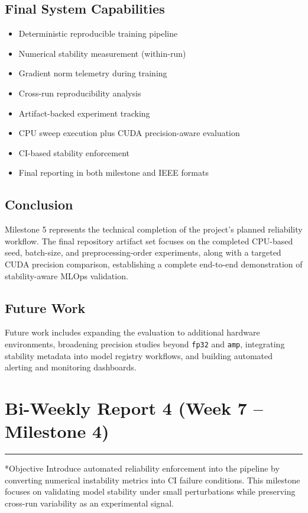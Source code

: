 \documentclass[11pt]{article}
\newcommand{\reportblock}[2]{%
  \section*{#1}%
  \vspace{2pt}\hrule\vspace{6pt}
}
\begin{document}
\subsection*{Final System Capabilities}
\begin{itemize}
  \item Deterministic reproducible training pipeline
  \item Numerical stability measurement (within-run)
  \item Gradient norm telemetry during training
  \item Cross-run reproducibility analysis
  \item Artifact-backed experiment tracking
  \item CPU sweep execution plus CUDA precision-aware evaluation
  \item CI-based stability enforcement
  \item Final reporting in both milestone and IEEE formats
\end{itemize}

\subsection*{Conclusion}
Milestone 5 represents the technical completion of the project’s planned reliability workflow. The final repository artifact set focuses on the completed CPU-based seed, batch-size, and preprocessing-order experiments, along with a targeted CUDA precision comparison, establishing a complete end-to-end demonstration of stability-aware MLOps validation.

\subsection*{Future Work}
Future work includes expanding the evaluation to additional hardware environments, broadening precision studies beyond \texttt{fp32} and \texttt{amp}, integrating stability metadata into model registry workflows, and building automated alerting and monitoring dashboards.
\reportblock{Bi-Weekly Report 4 (Week 7 -- Milestone 4)}

\subsection*{Objective}
Introduce automated reliability enforcement into the pipeline by converting numerical instability metrics into CI failure conditions. This milestone focuses on validating model stability under small perturbations while preserving cross-run variability as an experimental signal.
\end{document}
